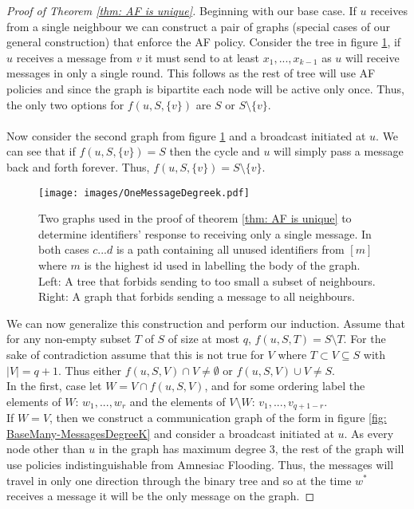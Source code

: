\begin{proof}[Proof of Theorem \ref{thm: AF is unique}]
    Beginning with our base case.
    If $u$ receives from a single neighbour we can construct a pair of graphs (special cases of our general construction) that enforce the AF policy. 
    Consider the tree in figure \ref{fig:OneMessageDegreeK}, if $u$ receives a message from $v$ it must send to at least $x_1,...,x_{k-1}$ as $u$ will receive messages in only a single round. 
    This follows as the rest of tree will use AF policies and since the graph is bipartite each node will be active only once. 
    Thus, the only two options for $f(u,S,\{v\})$ are $S$ or $S\setminus \{v\}$.\\ \\
    Now consider the second graph from figure \ref{fig:OneMessageDegreeK} and a broadcast initiated at $u$. 
    We can see that if $f(u,S,\{v\})=S$ then the cycle and $u$ will simply pass a message back and forth forever. 
    Thus, $f(u,S,\{v\})=S\setminus\{v\}$.
    \begin{figure}
        \centering
        \texttt{[image: images/OneMessageDegreek.pdf]}
        \caption{Two graphs used in the proof of theorem \ref{thm: AF is unique} to determine identifiers' response to receiving only a single message. In both cases $c...d$ is a path containing all unused identifiers from $[m]$ where $m$ is the highest id used in labelling the body of the graph. Left: A tree that forbids sending to too small a subset of neighbours. Right: A graph that forbids sending a message to all neighbours.}
        \label{fig:OneMessageDegreeK}
    \end{figure}
        We can now generalize this construction and perform our induction. 
    Assume that for any non-empty subset $T$ of $S$ of size at most $q$, $f(u,S,T)=S\setminus T$. 
    For the sake of contradiction assume that this is not true for $V$ where $T\subset V \subseteq S$ with $|V|=q+1$. 
    Thus either $f(u,S,V)\cap V\neq \emptyset$ or $f(u,S,V)\cup V\neq S$. \\ 
    In the first, case let $W=V\cap f(u,S,V)$, and for some ordering label the elements of $W$: $w_1,...,w_r$ and the elements of $V\setminus W$: $v_1,...,v_{q+1-r}$.\\ 
    If $W=V$, then we construct a communication graph of the form in figure \ref{fig: BaseMany-MessagesDegreeK} and consider a broadcast initiated at $u$. 
    As every node other than $u$ in the graph has maximum degree $3$, the rest of the graph will use policies indistinguishable from Amnesiac Flooding. 
    Thus, the messages will travel in only one direction through the binary tree and so at the time $w^*$ receives a message it will be the only message on the graph. 

\end{proof}
